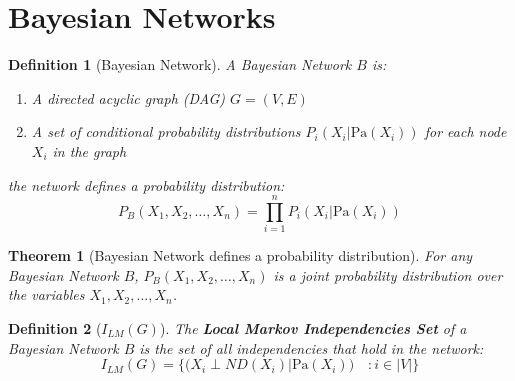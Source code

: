 \documentclass[11pt]{article}
\numberwithin{equation}{section}
\theoremstyle{boldStyle}
\theoremstyle{boldBlueStyle}
\theoremstyle{boldPurpleStyle}
\newtheorem{theorem}{Theorem}[section]
\theoremstyle{boldRedStyle}
\newtheorem{definition}{Definition}[section]
\begin{document}
\newpage
\section{Bayesian Networks}


\begin{definition}[Bayesian Network]
    A Bayesian Network $B$ is:
    \begin{enumerate}
        \item A directed acyclic graph (DAG) $G = (V, E)$
        \item A set of conditional probability distributions $P_i(X_i | \text{Pa}(X_i))$ for each node $X_i$ in the graph
    \end{enumerate}
    the network defines a probability distribution: 
    \begin{equation*}
        P_B(X_1, X_2, \ldots, X_n) = \prod_{i=1}^{n} P_i(X_i | \text{Pa}(X_i))
    \end{equation*}
\end{definition}

\begin{theorem}[Bayesian Network defines a probability distribution]
    For any Bayesian Network $B$, $P_B(X_1, X_2, \ldots, X_n)$ is a joint probability distribution over the variables $X_1, X_2, \ldots, X_n$.
\end{theorem}

\begin{definition}[$I_{LM}(G)$]
    The \textbf{Local Markov Independencies Set} of a Bayesian Network $B$ is the set of all independencies that hold in the network:
    \begin{equation*}
        I_{LM}(G) = \{ (X_i \perp ND(X_i) | \text{Pa}(X_i)) \quad : i \in |V| \}
    \end{equation*}
\end{definition}
\end{document}

